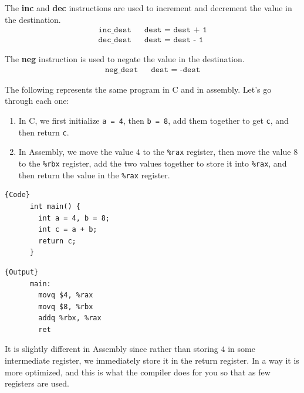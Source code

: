 \documentclass{article}
\begin{document}
  \begin{definition}
    The \textbf{inc} and \textbf{dec} instructions are used to increment and decrement the value in the destination. 
    \begin{align*}
      \texttt{inc\_ dest} && \texttt{dest = dest + 1} \\
      \texttt{dec\_ dest} && \texttt{dest = dest - 1}
    \end{align*}
  \end{definition}

  \begin{definition}[Negative]
    The \textbf{neg} instruction is used to negate the value in the destination. 
    \begin{align*}
      \texttt{neg\_ dest} && \texttt{dest = -dest} 
    \end{align*}
  \end{definition}

  \begin{example}
    The following represents the same program in C and in assembly. Let's go through each one: 
    \begin{enumerate}
      \item In C, we first initialize \texttt{a = 4}, then \texttt{b = 8}, add them together to get \texttt{c}, and then return \texttt{c}.
      \item In Assembly, we move the value $4$ to the \texttt{\%rax} register, then move the value $8$ to the \texttt{\%rbx} register, add the two values together to store it into \texttt{\%rax}, and then return the value in the \texttt{\%rax} register.
    \end{enumerate}
    \noindent\begin{minipage}{.5\textwidth}
    \begin{lstlisting}[]{Code}
      int main() {
        int a = 4, b = 8; 
        int c = a + b; 
        return c; 
      }
    \end{lstlisting}
    \end{minipage}
    \hfill
    \begin{minipage}{.49\textwidth}
    \begin{lstlisting}[]{Output}
      main:
        movq $4, %rax
        movq $8, %rbx
        addq %rbx, %rax
        ret
    \end{lstlisting}
    \end{minipage}
    It is slightly different in Assembly since rather than storing $4$ in some intermediate register, we immediately store it in the return register. In a way it is more optimized, and this is what the compiler does for you so that as few registers are used. 
  \end{example}
\end{document}
